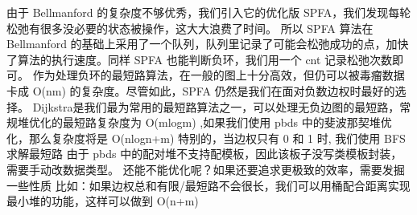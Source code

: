 {}
\markdownRendererSectionEnd \markdownRendererSectionBegin
{}\markdownRendererInterblockSeparator
{}由于 \markdownRendererDollarSign{}Bellmanford\markdownRendererDollarSign{} 的复杂度不够优秀，我们引入它的优化版 \markdownRendererDollarSign{}SPFA\markdownRendererDollarSign{}，我们发现每轮松弛有很多没必要的状态被操作，这大大浪费了时间。\markdownRendererParagraphSeparator
{}所以 \markdownRendererDollarSign{}SPFA\markdownRendererDollarSign{} 算法在 \markdownRendererDollarSign{}Bellmanford\markdownRendererDollarSign{} 的基础上采用了一个队列，队列里记录了可能会松弛成功的点，加快了算法的执行速度。同样 \markdownRendererDollarSign{}SPFA\markdownRendererDollarSign{} 也能判断负环，我们用一个 \markdownRendererDollarSign{}cnt\markdownRendererDollarSign{} 记录松弛次数即可。\markdownRendererParagraphSeparator
{}作为处理负环的最短路算法，在一般的图上十分高效，但仍可以被毒瘤数据卡成 \markdownRendererDollarSign{}O(nm)\markdownRendererDollarSign{} 的复杂度。尽管如此，\markdownRendererDollarSign{}SPFA\markdownRendererDollarSign{} 仍然是我们在面对负数边权时最好的选择。\markdownRendererInterblockSeparator
{}\markdownRendererInterblockSeparator
{}
\markdownRendererSectionEnd \markdownRendererSectionBegin
{}\markdownRendererInterblockSeparator
{}Dijkstra是我们最为常用的最短路算法之一，可以处理无负边图的最短路，常规堆优化的最短路复杂度为\markdownRendererDollarSign{} O(mlogm) \markdownRendererDollarSign{},如果我们使用\markdownRendererDollarSign{} pbds \markdownRendererDollarSign{}中的斐波那契堆优化，那么复杂度将是\markdownRendererDollarSign{} O(nlogn+m) \markdownRendererDollarSign{}\markdownRendererParagraphSeparator
{}特别的，当边权只有 \markdownRendererDollarSign{}0\markdownRendererDollarSign{} 和 \markdownRendererDollarSign{}1\markdownRendererDollarSign{} 时, 我们使用 \markdownRendererDollarSign{}BFS\markdownRendererDollarSign{} 求解最短路\markdownRendererParagraphSeparator
{}由于\markdownRendererDollarSign{} pbds \markdownRendererDollarSign{}中的配对堆不支持配模板，因此该板子没写类模板封装，需要手动改数据类型。\markdownRendererInterblockSeparator
{}\markdownRendererInterblockSeparator
{}还能不能优化呢？如果还要追求更极致的效率，需要发掘一些性质\markdownRendererParagraphSeparator
{}比如：如果边权总和有限/最短路不会很长，我们可以用桶配合距离实现最小堆的功能，这样可以做到\markdownRendererDollarSign{} O(n+m) \markdownRendererDollarSign{}\markdownRendererInterblockSeparator

